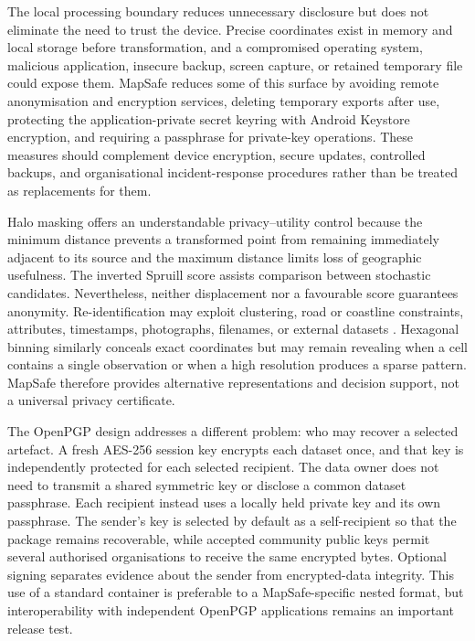 \documentclass[a4paper,UKenglish,cleveref,autoref,thm-restate]{lipics-v2021}
\begin{document}
The local processing boundary reduces unnecessary disclosure but does not eliminate the need to trust the device. Precise coordinates exist in memory and local storage before transformation, and a compromised operating system, malicious application, insecure backup, screen capture, or retained temporary file could expose them. MapSafe reduces some of this surface by avoiding remote anonymisation and encryption services, deleting temporary exports after use, protecting the application-private secret keyring with Android Keystore encryption, and requiring a passphrase for private-key operations. These measures should complement device encryption, secure updates, controlled backups, and organisational incident-response procedures rather than be treated as replacements for them.

Halo masking offers an understandable privacy--utility control because the minimum distance prevents a transformed point from remaining immediately adjacent to its source and the maximum distance limits loss of geographic usefulness. The inverted Spruill score assists comparison between stochastic candidates. Nevertheless, neither displacement nor a favourable score guarantees anonymity. Re-identification may exploit clustering, road or coastline constraints, attributes, timestamps, photographs, filenames, or external datasets \citep{kessler2018geoprivacy,zhang2022rehumanize,cassa2008re,zimmerman2008quantifying}. Hexagonal binning similarly conceals exact coordinates but may remain revealing when a cell contains a single observation or when a high resolution produces a sparse pattern. MapSafe therefore provides alternative representations and decision support, not a universal privacy certificate.

The OpenPGP design addresses a different problem: who may recover a selected artefact. A fresh AES-256 session key encrypts each dataset once, and that key is independently protected for each selected recipient. The data owner does not need to transmit a shared symmetric key or disclose a common dataset passphrase. Each recipient instead uses a locally held private key and its own passphrase. The sender's key is selected by default as a self-recipient so that the package remains recoverable, while accepted community public keys permit several authorised organisations to receive the same encrypted bytes. Optional signing separates evidence about the sender from encrypted-data integrity. This use of a standard container is preferable to a MapSafe-specific nested format, but interoperability with independent OpenPGP applications remains an important release test.
\end{document}

